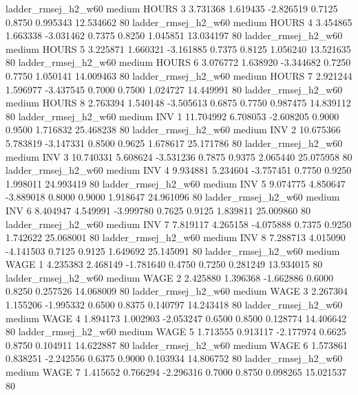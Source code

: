    ladder_rmsej_h2_w60     medium    HOURS                 3  3.731368 1.619435 -2.826519 0.7125 0.8750  0.995343   12.534662 80
   ladder_rmsej_h2_w60     medium    HOURS                 4  3.454865 1.663338 -3.031462 0.7375 0.8250  1.045851   13.034197 80
   ladder_rmsej_h2_w60     medium    HOURS                 5  3.225871 1.660321 -3.161885 0.7375 0.8125  1.056240   13.521635 80
   ladder_rmsej_h2_w60     medium    HOURS                 6  3.076772 1.638920 -3.344682 0.7250 0.7750  1.050141   14.009463 80
   ladder_rmsej_h2_w60     medium    HOURS                 7  2.921244 1.596977 -3.437545 0.7000 0.7500  1.024727   14.449991 80
   ladder_rmsej_h2_w60     medium    HOURS                 8  2.763394 1.540148 -3.505613 0.6875 0.7750  0.987475   14.839112 80
   ladder_rmsej_h2_w60     medium      INV                 1 11.704992 6.708053 -2.608205 0.9000 0.9500  1.716832   25.468238 80
   ladder_rmsej_h2_w60     medium      INV                 2 10.675366 5.783819 -3.147331 0.8500 0.9625  1.678617   25.171786 80
   ladder_rmsej_h2_w60     medium      INV                 3 10.740331 5.608624 -3.531236 0.7875 0.9375  2.065440   25.075958 80
   ladder_rmsej_h2_w60     medium      INV                 4  9.934881 5.234604 -3.757451 0.7750 0.9250  1.998011   24.993419 80
   ladder_rmsej_h2_w60     medium      INV                 5  9.074775 4.850647 -3.889018 0.8000 0.9000  1.918647   24.961096 80
   ladder_rmsej_h2_w60     medium      INV                 6  8.404947 4.549991 -3.999780 0.7625 0.9125  1.839811   25.009860 80
   ladder_rmsej_h2_w60     medium      INV                 7  7.819117 4.265158 -4.075888 0.7375 0.9250  1.742622   25.068001 80
   ladder_rmsej_h2_w60     medium      INV                 8  7.288713 4.015090 -4.141503 0.7125 0.9125  1.649692   25.145091 80
   ladder_rmsej_h2_w60     medium     WAGE                 1  4.235383 2.468149 -1.781640 0.4750 0.7250  0.281249   13.934015 80
   ladder_rmsej_h2_w60     medium     WAGE                 2  2.425880 1.396368 -1.662886 0.6000 0.8250  0.257526   14.068009 80
   ladder_rmsej_h2_w60     medium     WAGE                 3  2.267304 1.155206 -1.995332 0.6500 0.8375  0.140797   14.243418 80
   ladder_rmsej_h2_w60     medium     WAGE                 4  1.894173 1.002903 -2.053247 0.6500 0.8500  0.128774   14.406642 80
   ladder_rmsej_h2_w60     medium     WAGE                 5  1.713555 0.913117 -2.177974 0.6625 0.8750  0.104911   14.622887 80
   ladder_rmsej_h2_w60     medium     WAGE                 6  1.573861 0.838251 -2.242556 0.6375 0.9000  0.103934   14.806752 80
   ladder_rmsej_h2_w60     medium     WAGE                 7  1.415652 0.766294 -2.296316 0.7000 0.8750  0.098265   15.021537 80
